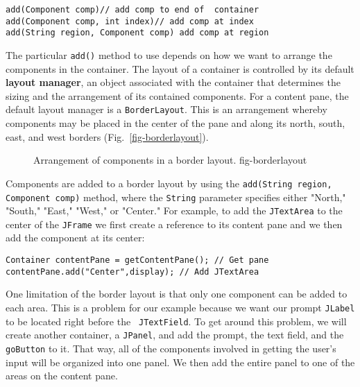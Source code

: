 \begin{jjjlisting}
\begin{lstlisting}
add(Component comp)// add comp to end of  container
add(Component comp, int index)// add comp at index
add(String region, Component comp) add comp at region
\end{lstlisting}
\end{jjjlisting}

\noindent The particular {\tt add()} method to use depends on how we
want to arrange the components in the container. The layout of a
container is controlled by its default {\bf layout manager}, an object
associated with the container that determines the sizing and the
arrangement of its contained components. For a content pane, the
default layout manager is a {\tt BorderLayout}. This is an arrangement
whereby components may be placed in the center of the pane and along
its north, south, east, and west borders
(Fig.~\ref{fig-borderlayout}).
\begin{figure}[h!]
{Arrangement of components in a border layout.
} {fig-borderlayout}

\end{figure}


Components are added to a border layout by using the {\tt add(String
region, Component comp)} method, where the {\tt String} parameter
specifies either "North," "South," "East," "West," or "Center."  For
example, to add the {\tt JTextArea} to the center of the {\tt JFrame}
we first create a reference to its content pane and we then add the component at
its center:

\begin{jjjlisting}
\begin{lstlisting}
Container contentPane = getContentPane(); // Get pane
contentPane.add("Center",display); // Add JTextArea
\end{lstlisting}
\end{jjjlisting}

One limitation of the border layout is that only one component can be
added to each area. This is a problem for our example because we want
our prompt {\tt JLabel} to be located right before the {\tt
JTextField}.  To get around this problem, we will create another
container, a {\tt JPanel}, and add the prompt, the text field, and the
{\tt goButton} to it. That way, all of the components involved in
getting the user's input will be organized into one panel.  We then
add the entire panel to one of the areas on the content pane.

